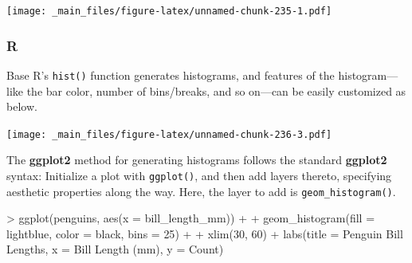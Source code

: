 \documentclass[
]{book}
\newenvironment{Shaded}{\begin{snugshade}}{\end{snugshade}}
\newcommand{\AttributeTok}[1]{\textcolor[rgb]{0.77,0.63,0.00}{#1}}
\newcommand{\DecValTok}[1]{\textcolor[rgb]{0.00,0.00,0.81}{#1}}
\newcommand{\FunctionTok}[1]{\textcolor[rgb]{0.00,0.00,0.00}{#1}}
\newcommand{\NormalTok}[1]{#1}
\newcommand{\SpecialCharTok}[1]{\textcolor[rgb]{0.00,0.00,0.00}{#1}}
\newcommand{\StringTok}[1]{\textcolor[rgb]{0.31,0.60,0.02}{#1}}
\begin{document}
\texttt{[image: \_main\_files/figure-latex/unnamed-chunk-235-1.pdf]}

\hypertarget{r-39}{%
\subsubsection*{R}\label{r-39}}

Base R's \texttt{hist()} function generates histograms, and features of the histogram---like the bar color, number of bins/breaks, and so on---can be easily customized as below.

\begin{Shaded}
\end{Shaded}

\texttt{[image: \_main\_files/figure-latex/unnamed-chunk-236-3.pdf]}

The \textbf{ggplot2} method for generating histograms follows the standard \textbf{ggplot2} syntax: Initialize a plot with \texttt{ggplot()}, and then add layers thereto, specifying aesthetic properties along the way. Here, the layer to add is \texttt{geom\_histogram()}.

\begin{Shaded}
\begin{Highlighting}[]
\SpecialCharTok{\textgreater{}} \FunctionTok{ggplot}\NormalTok{(penguins, }\FunctionTok{aes}\NormalTok{(}\AttributeTok{x =}\NormalTok{ bill\_length\_mm)) }\SpecialCharTok{+}
\SpecialCharTok{+}   \FunctionTok{geom\_histogram}\NormalTok{(}\AttributeTok{fill =} \StringTok{\textquotesingle{}lightblue\textquotesingle{}}\NormalTok{, }\AttributeTok{color =} \StringTok{\textquotesingle{}black\textquotesingle{}}\NormalTok{, }\AttributeTok{bins =} \DecValTok{25}\NormalTok{) }\SpecialCharTok{+}
\SpecialCharTok{+}   \FunctionTok{xlim}\NormalTok{(}\DecValTok{30}\NormalTok{, }\DecValTok{60}\NormalTok{) }\SpecialCharTok{+} \FunctionTok{labs}\NormalTok{(}\AttributeTok{title =} \StringTok{\textquotesingle{}Penguin Bill Lengths\textquotesingle{}}\NormalTok{, }\AttributeTok{x =} \StringTok{\textquotesingle{}Bill Length (mm)\textquotesingle{}}\NormalTok{, }\AttributeTok{y =} \StringTok{\textquotesingle{}Count\textquotesingle{}}\NormalTok{)}
\end{Highlighting}
\end{Shaded}
\end{document}

